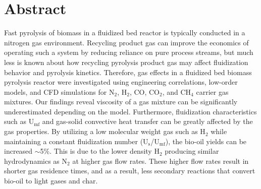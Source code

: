 
\section*{Abstract}

Fast pyrolysis of biomass in a fluidized bed reactor is typically conducted in a nitrogen gas environment. Recycling product gas can improve the economics of operating such a system by reducing reliance on pure process streams, but much less is known about how recycling pyrolysis product gas may affect fluidization behavior and pyrolysis kinetics. Therefore, gas effects in a fluidized bed biomass pyrolysis reactor were investigated using engineering correlations, low-order models, and CFD simulations for N$_2$, H$_2$, CO, CO$_2$, and CH$_4$ carrier gas mixtures. Our findings reveal viscosity of a gas mixture can be significantly underestimated depending on the model. Furthermore, fluidization characteristics such as U$_\textrm{mf}$ and gas-solid convective heat transfer can be greatly affected by the gas properties. By utilizing a low molecular weight gas such as H$_2$ while maintaining a constant fluidization number (U$_\text{s}$/U$_\text{mf}$), the bio-oil yields can be increased $\sim$5\%. This is due to the lower density H$_2$ producing similar hydrodynamics as N$_2$ at higher gas flow rates. These higher flow rates result in shorter gas residence times, and as a result, less secondary reactions that convert bio-oil to light gases and char.
